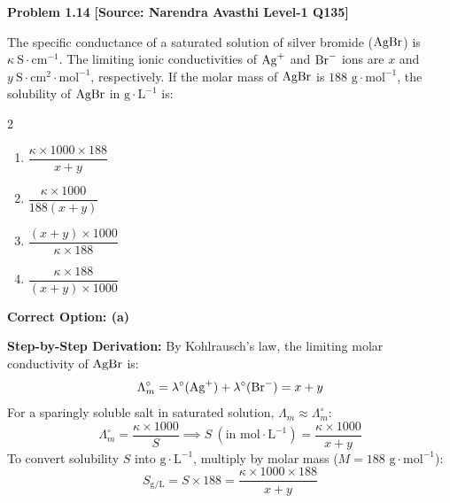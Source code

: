 \begin{problembox}
\textbf{Problem 1.14} \hfill \textbf{[Source: Narendra Avasthi Level-1 Q135]}

The specific conductance of a saturated solution of silver bromide ($\ce{AgBr}$) is $\kappa\ \text{S}\cdot\text{cm}^{-1}$. The limiting ionic conductivities of $\ce{Ag+}$ and $\ce{Br-}$ ions are $x$ and $y\ \text{S}\cdot\text{cm}^2\cdot\text{mol}^{-1}$, respectively. If the molar mass of $\ce{AgBr}$ is $188\text{ g}\cdot\text{mol}^{-1}$, the solubility of $\ce{AgBr}$ in $\text{g}\cdot\text{L}^{-1}$ is:
\begin{multicols}{2}
\begin{enumerate}[label=(\alph*)]
    \item $\dfrac{\kappa \times 1000 \times 188}{x + y}$
    \item $\dfrac{\kappa \times 1000}{188(x + y)}$
    \item $\dfrac{(x + y) \times 1000}{\kappa \times 188}$
    \item $\dfrac{\kappa \times 188}{(x + y) \times 1000}$
\end{enumerate}
\end{multicols}
\end{problembox}
\begin{solution}
\textbf{Correct Option: (a)}

\textbf{Step-by-Step Derivation:}
By Kohlrausch's law, the limiting molar conductivity of $\ce{AgBr}$ is:
\begin{equation*}
    \Lambda_m^\circ = \lambda^\circ(\ce{Ag+}) + \lambda^\circ(\ce{Br-}) = x + y
\end{equation*}
For a sparingly soluble salt in saturated solution, $\Lambda_m \approx \Lambda_m^\circ$:
\begin{equation*}
    \Lambda_m^\circ = \frac{\kappa \times 1000}{S} \implies S\ (\text{in mol}\cdot\text{L}^{-1}) = \frac{\kappa \times 1000}{x + y}
\end{equation*}
To convert solubility $S$ into $\text{g}\cdot\text{L}^{-1}$, multiply by molar mass ($M = 188\text{ g}\cdot\text{mol}^{-1}$):
\begin{equation*}
    S_{\text{g/L}} = S \times 188 = \frac{\kappa \times 1000 \times 188}{x + y}
\end{equation*}
\end{solution}

